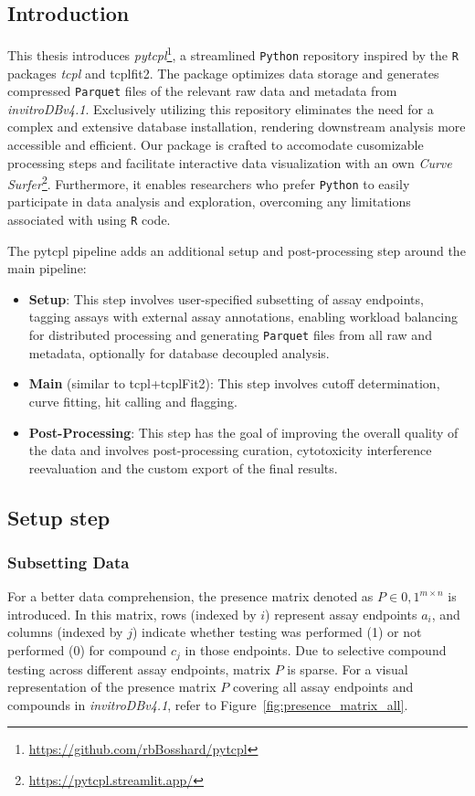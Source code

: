 \subsection{Introduction} 
This thesis introduces \emph{pytcpl}\footnote{\url{https://github.com/rbBosshard/pytcpl}}, a streamlined \texttt{Python} repository inspired by the \texttt{R} packages \emph{tcpl} and {tcplfit2}. The package optimizes data storage and generates compressed \texttt{Parquet} files of the relevant raw data and metadata from \emph{invitroDBv4.1}. Exclusively utilizing this repository eliminates the need for a complex and extensive database installation, rendering downstream analysis more accessible and efficient. Our package is crafted to accomodate cusomizable processing steps and facilitate interactive data visualization with an own \emph{Curve Surfer}\footnote{\url{https://pytcpl.streamlit.app/}}. Furthermore, it enables researchers who prefer \texttt{Python} to easily participate in data analysis and exploration, overcoming any limitations associated with using \texttt{R} code.

The pytcpl pipeline adds an additional setup and post-processing step around the main pipeline:
\begin{itemize}
    \item \textbf{Setup}: This step involves user-specified subsetting of assay endpoints, tagging assays with external assay annotations, enabling workload balancing for distributed processing and generating \texttt{Parquet} files from all raw and metadata, optionally for database decoupled analysis.
    \item \textbf{Main} (similar to tcpl+tcplFit2): This step involves cutoff determination, curve fitting, hit calling and flagging.
    \item \textbf{Post-Processing}: This step has the goal of improving the overall quality of the data and involves post-processing curation, cytotoxicity interference reevaluation and the custom export of the final results.
\end{itemize}

\subsection{Setup step}\label{sec:subset_data}
\subsubsection{Subsetting Data}
For a better data comprehension, the presence matrix denoted as $P \in {{0, 1}}^{m \times n}$ is introduced. In this matrix, rows (indexed by $i$) represent assay endpoints $a_i$, and columns (indexed by $j$) indicate whether testing was performed (1) or not performed (0) for compound $c_j$ in those endpoints. Due to selective compound testing across different assay endpoints, matrix $P$ is sparse. For a visual representation of the presence matrix $P$ covering all assay endpoints and compounds in \textit{invitroDBv4.1}, refer to Figure~\ref{fig:presence_matrix_all}.

